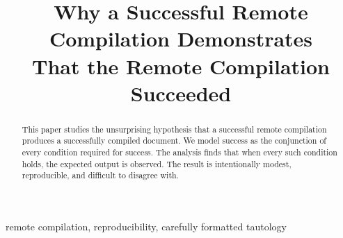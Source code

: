 \documentclass[conference]{IEEEtran}
\title{Why a Successful Remote Compilation Demonstrates\\
That the Remote Compilation Succeeded}
\author{\IEEEauthorblockN{The Authors}}
\begin{document}
\maketitle

\begin{abstract}
This paper studies the unsurprising hypothesis that a successful remote
compilation produces a successfully compiled document. We model success as the
conjunction of every condition required for success. The analysis finds that
when every such condition holds, the expected output is observed. The result
is intentionally modest, reproducible, and difficult to disagree with.
\end{abstract}

\begin{IEEEkeywords}
remote compilation, reproducibility, carefully formatted tautology
\end{IEEEkeywords}







\end{document}
